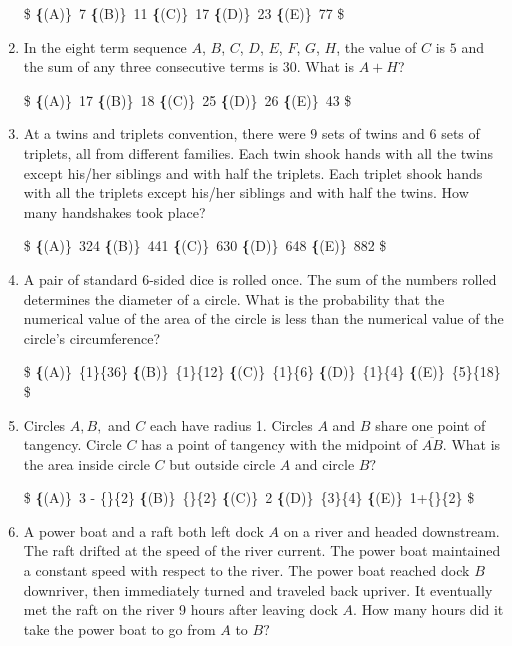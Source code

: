 \documentclass{article}
\begin{document}
\begin{enumerate}[label=\arabic*., itemsep=0.5em]
\$
\textbf\{(A)\}\ 7 \qquad
\textbf\{(B)\}\ 11 \qquad
\textbf\{(C)\}\ 17 \qquad
\textbf\{(D)\}\ 23 \qquad
\textbf\{(E)\}\ 77 \$\par \vspace{0.5em}\item In the eight term sequence $A$, $B$, $C$, $D$, $E$, $F$, $G$, $H$, the value of $C$ is $5$ and the sum of any three consecutive terms is $30$. What is $A+H$?

\$
\textbf\{(A)\}\ 17 \qquad
\textbf\{(B)\}\ 18 \qquad
\textbf\{(C)\}\ 25 \qquad
\textbf\{(D)\}\ 26 \qquad
\textbf\{(E)\}\ 43 \$\par \vspace{0.5em}\item At a twins and triplets convention, there were $9$ sets of twins and $6$ sets of triplets, all from different families. Each twin shook hands with all the twins except his/her siblings and with half the triplets. Each triplet shook hands with all the triplets except his/her siblings and with half the twins. How many handshakes took place?

\$
\textbf\{(A)\}\ 324 \qquad
\textbf\{(B)\}\ 441 \qquad
\textbf\{(C)\}\ 630 \qquad
\textbf\{(D)\}\ 648 \qquad
\textbf\{(E)\}\ 882 \$\par \vspace{0.5em}\item A pair of standard $6$-sided dice is rolled once. The sum of the numbers rolled determines the diameter of a circle. What is the probability that the numerical value of the area of the circle is less than the numerical value of the circle's circumference?

\$
\textbf\{(A)\}\ \frac\{1\}\{36\} \qquad
\textbf\{(B)\}\ \frac\{1\}\{12\} \qquad
\textbf\{(C)\}\ \frac\{1\}\{6\} \qquad
\textbf\{(D)\}\ \frac\{1\}\{4\} \qquad
\textbf\{(E)\}\ \frac\{5\}\{18\} \$\par \vspace{0.5em}\item Circles $A, B,$ and $C$ each have radius 1. Circles $A$ and $B$ share one point of tangency. Circle $C$ has a point of tangency with the midpoint of $\overline{AB}.$ What is the area inside circle $C$ but outside circle $A$ and circle $B?$

\$
\textbf\{(A)\}\ 3 - \frac\{\pi\}\{2\} \qquad
\textbf\{(B)\}\ \frac\{\pi\}\{2\} \qquad
\textbf\{(C)\}\  2 \qquad
\textbf\{(D)\}\ \frac\{3\pi\}\{4\} \qquad
\textbf\{(E)\}\ 1+\frac\{\pi\}\{2\} \$\par \vspace{0.5em}\item A power boat and a raft both left dock $A$ on a river and headed downstream. The raft drifted at the speed of the river current. The power boat maintained a constant speed with respect to the river. The power boat reached dock $B$ downriver, then immediately turned and traveled back upriver. It eventually met the raft on the river 9 hours after leaving dock $A.$ How many hours did it take the power boat to go from $A$ to $B?$


\end{enumerate}
\end{document}
